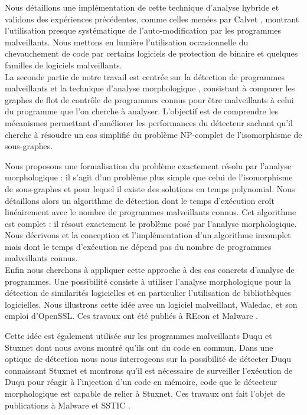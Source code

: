 Nous détaillons une implémentation de cette technique d'analyse hybride et validons des expériences précédentes, comme celles menées par Calvet  \cite{Calvet2013}, montrant l'utilisation presque systématique de l'auto-modification par les programmes malveillants.
Nous mettons en lumière l'utilisation occasionnelle du chevauchement de code par certains logiciels de protection de binaire et quelques familles de logiciels malveillants.
\\

La seconde partie de notre travail est centrée sur la détection de programmes malveillants et la technique d'analyse morphologique \cite{BKM08}, consistant à comparer les graphes de flot de contrôle de programmes connus pour être malveillants à celui du programme que l'on cherche à analyser.
L'objectif est de comprendre les mécanismes permettant d'améliorer les performances du détecteur sachant qu'il cherche à résoudre un cas simplifié du problème NP-complet de l'isomorphisme de sous-graphes.

Nous proposons une formalisation du problème exactement résolu par l'analyse morphologique : il s'agit d'un problème plus simple que celui de l'isomorphisme de sous-graphes et pour lequel il existe des solutions en temps polynomial.
Nous détaillons alors un algorithme de détection dont le temps d'exécution croît linéairement avec le nombre de programmes malveillants connus. Cet algorithme est complet : il résout exactement le problème posé par l'analyse morphologique.
Nous décrivons et la conception et l'implémentation d'un algorithme incomplet mais dont le temps d'exécution ne dépend pas du nombre de programmes malveillants connus.
\\

Enfin nous cherchons à appliquer cette approche à des cas concrets d'analyse de programmes.
Une possibilité consiste à utiliser l'analyse morphologique pour la détection de similarités logicielles et en particulier l'utilisation de bibliothèques logicielles.
Nous illustrons cette idée avec un logiciel malveillant, Waledac, et son emploi d'OpenSSL.
Ces travaux ont été publiés à REcon \cite{REAT12} et Malware \cite{mal12}.

Cette idée est également utilisée sur les programmes malveillants Duqu et Stuxnet dont nous avons montré qu'ils ont du code en commun.
Dans une optique de détection nous nous interrogeons sur la possibilité de détecter Duqu connaissant Stuxnet et montrons qu'il est nécessaire de surveiller l'exécution de Duqu pour réagir à l'injection d'un code en mémoire, code que le détecteur morphologique est capable de relier à Stuxnet.
Ces travaux ont fait l'objet de publications à Malware \cite{mal13} et SSTIC \cite{sstic13}.

